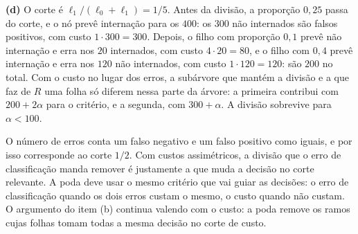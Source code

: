 \begin{solucao}
\smallskip
\textbf{(d)} O corte é $\ell_1/(\ell_0+\ell_1)=1/5$. Antes da divisão, a proporção $0{,}25$
passa do corte, e o nó prevê internação para os $400$: os $300$ não internados são falsos
positivos, com custo $1\cdot300=300$. Depois, o filho com proporção $0{,}1$ prevê não internação
e erra nos $20$ internados, com custo $4\cdot20=80$, e o filho com $0{,}4$ prevê internação e erra
nos $120$ não internados, com custo $1\cdot120=120$: são $200$ no total. Com o custo no lugar
dos erros, a subárvore que mantém a divisão e a que faz de $R$ uma folha só diferem nessa
parte da árvore: a primeira contribui com $200+2\alpha$ para o critério, e a segunda, com
$300+\alpha$. A divisão sobrevive para $\alpha<100$.

O número de erros conta um falso negativo e um falso positivo como iguais, e por isso
corresponde ao corte $1/2$. Com custos assimétricos, a divisão que o erro de classificação
manda remover é justamente a que muda a decisão no corte relevante. A poda deve usar o mesmo
critério que vai guiar as decisões: o erro de classificação quando os dois erros custam o
mesmo, o custo quando não custam. O argumento do item (b) continua valendo com o custo: a poda
remove os ramos cujas folhas tomam todas a mesma decisão no corte de custo.
\end{solucao}
